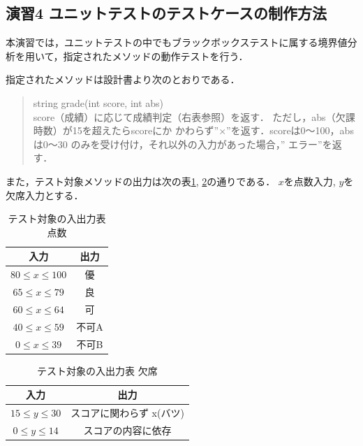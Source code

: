 \documentclass[platex,dvipdfmx,12pt]{jsarticle}
\begin{document}
\subsection{演習4 ユニットテストのテストケースの制作方法}
本演習では，ユニットテストの中でもブラックボックステストに属する境界値分析を用いて，指定されたメソッドの動作テストを行う．

指定されたメソッドは設計書より次のとおりである\cite{journal:sekkeisyo}．

\begin{quote}
string grade(int score, int abs) \\

score（成績）に応じて成績判定（右表参照）を返す．
ただし，abs（欠課時数）が15を超えたらscoreにか
かわらず”×”を返す．scoreは0～100，absは0～30
のみを受け付け，それ以外の入力があった場合，”
エラー”を返す．
\end{quote}

また，テスト対象メソッドの出力は次の表\ref{tab:enshu4-target-method-1}, \ref{tab:enshu4-target-method-2}の通りである．
$x$を点数入力, $y$を欠席入力とする．

\begin{table}[H]
  \centering
  \caption{テスト対象の入出力表 点数}
  \label{tab:enshu4-target-method-1}
  \begin{tabular}{cc}
    入力 & 出力 \\
    \hline
    $80 \leq x \leq 100$ & 優 \\
    $65 \leq x \leq 79$ & 良 \\
    $60 \leq x \leq 64$ & 可 \\
    $40 \leq x \leq 59$ & 不可A \\
    $0 \leq x \leq 39$ & 不可B \\
  \end{tabular}
\end{table}

\begin{table}[H]
  \centering
  \caption{テスト対象の入出力表 欠席}
  \label{tab:enshu4-target-method-2}
  \begin{tabular}{cc}
    入力 & 出力 \\
    \hline
    $15 \leq y \leq 30$ & スコアに関わらず x(バツ)\\
    $0 \leq y \leq 14 $ & スコアの内容に依存 \\
  \end{tabular}
\end{table}
\end{document}
